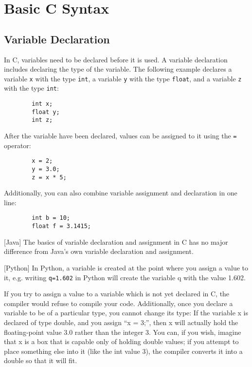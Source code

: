 \documentclass[oneside]{book}
\begin{document}
\chapter{Basic C Syntax}
    \section{Variable Declaration}
    In C, variables need to be declared before it is used. A variable declaration includes declaring the type of the variable. The following example declares a variable \texttt{x} with the type \texttt{int}, a variable \texttt{y} with the type \texttt{float}, and a variable \texttt{z} with the type \texttt{int}:
    \begin{verbatim}
        int x;
        float y;
        int z;
    \end{verbatim}
    After the variable have been declared, values can be assigned to it using the \verb|=| operator:
    \begin{verbatim}
        x = 2;
        y = 3.0;
        z = x * 5;
    \end{verbatim}
    Additionally, you can also combine variable assignment and declaration in one line:
    \begin{verbatim}
        int b = 10;
        float f = 3.1415;
    \end{verbatim}

    [Java]
    The basics of variable declaration and assignment in C has no major difference from Java's own variable declaration and assignment.
    
    [Python]
    In Python, a variable is created at the point where you assign a value to it, e.g. writing \texttt{q=1.602} in Python will create the variable q with the value 1.602. 
    
    If you try to assign a value to a variable which is not yet declared in C, the compiler would refuse to compile your code. Additionally, once you declare a variable to be of a particular type, you cannot change its type: If the variable x is declared of type double, and you assign “x = 3;”, then x will actually hold the floating-point value 3.0 rather than the integer 3. You can, if you wish, imagine that x is a box that is capable only of holding double values; if you attempt to place something else into it (like the int value 3), the compiler converts it into a double so that it will fit. %

\end{document}
